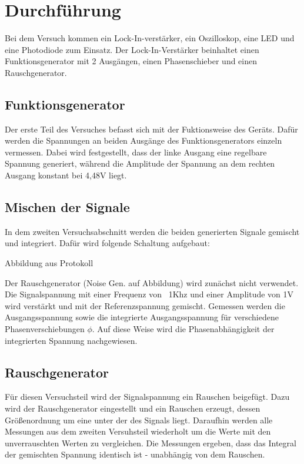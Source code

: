 \section{Durchführung}
\label{sec:Durchführung}

Bei dem Versuch kommen ein Lock-In-verstärker, ein Oszilloskop, eine
LED und eine Photodiode zum Einsatz. Der Lock-In-Verstärker beinhaltet
einen Funktionsgenerator  mit 2 Ausgängen, einen Phasenschieber und einen
Rauschgenerator.

\subsection{Funktionsgenerator}
Der erste Teil des Versuches befasst sich mit der Fuktionsweise des Geräts.
Dafür werden die Spannungen an beiden Ausgänge des Funktionsgenerators einzeln
vermessen. Dabei wird festgestellt, dass der linke Ausgang eine regelbare
Spannung generiert, während die Amplitude der Spannung an dem rechten
Ausgang konstant bei 4,48V liegt.

\subsection{Mischen der Signale}
In dem zweiten Versuchsabschnitt werden die beiden generierten Signale gemischt
und integriert. Dafür wird folgende Schaltung aufgebaut:

Abbildung aus Protokoll

Der Rauschgenerator (Noise Gen. auf Abbildung) wird zunächst nicht verwendet.
Die Signalspannung mit einer Frequenz von ~1Khz und einer Amplitude von 1V
wird verstärkt und mit der
Referenzspannung gemischt. Gemessen werden die Ausgangsspannung sowie die
integrierte Ausgangsspannung für verschiedene Phasenverschiebungen $\phi$. Auf
diese 
Weise wird die Phasenabhängigkeit der integrierten Spannung nachgewiesen.

\subsection{Rauschgenerator}
Für diesen Versuchsteil wird der Signalspannung ein Rauschen beigefügt. Dazu
wird der Rauschgenerator eingestellt und ein Rauschen erzeugt, dessen
Größenordnung um eine unter der des Signals liegt. Daraufhin werden alle
Messungen aus dem zweiten Versuhsteil wiederholt um die Werte mit den
unverrauschten Werten zu vergleichen. Die Messungen ergeben, dass das Integral
der gemischten Spannung identisch ist - unabhängig von dem Rauschen.

